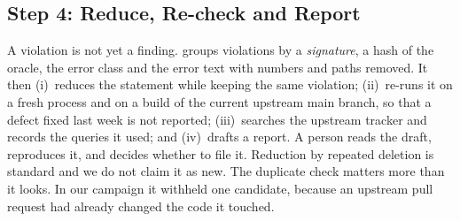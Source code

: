 \subsection{Step 4: Reduce, Re-check and Report}
\label{sec:step-triage}
A violation is not yet a finding. \tool groups violations by a \emph{signature},
a hash of the oracle, the error class and the error text with numbers and paths
removed. It then (i)~reduces the statement while keeping the same violation;
(ii)~re-runs it on a fresh process and on a build of the current upstream main
branch, so that a defect fixed last week is not reported; (iii)~searches the
upstream tracker and records the queries it used; and (iv)~drafts a report. A
person reads the draft, reproduces it, and decides whether to file it. Reduction
by repeated deletion is standard and we do not claim it as new. The duplicate
check matters more than it looks. In our campaign it withheld one candidate,
because an upstream pull request had already changed the code it touched.
